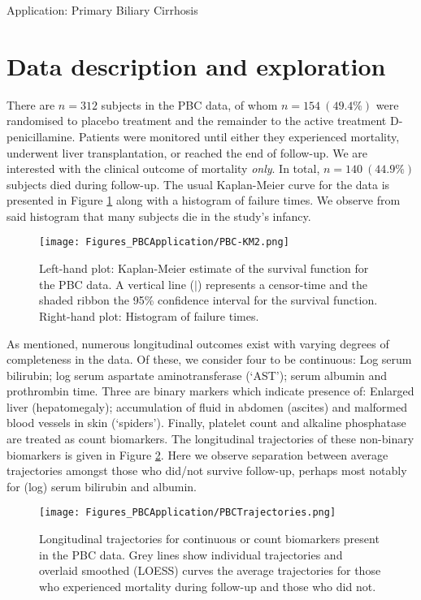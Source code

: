 \begin{chapter}{\label{cha:app-PBC}Application: Primary Biliary Cirrhosis}
  \section{Data description and exploration}\label{sec:pbc-eda}
  There are $n=312$ subjects in the PBC data, of whom $n=154\ (49.4\%)$ were randomised to placebo treatment and the remainder to the active treatment D-penicillamine. Patients were monitored until either they experienced mortality, underwent liver transplantation, or reached the end of follow-up. We are interested with the clinical outcome of mortality \textit{only}. In total, $n=140\ (44.9\%)$ subjects died during follow-up. The usual Kaplan-Meier curve for the data is presented in Figure \ref{fig:pbc-survival-KM} along with a histogram of failure times. We observe from said histogram that many subjects die in the study's infancy.

  \begin{figure}[ht]
      \centering
      \texttt{[image: Figures\_PBCApplication/PBC-KM2.png]}
      \caption{Left-hand plot: Kaplan-Meier estimate of the survival function for the PBC data. A vertical line ($|$) represents a censor-time and the shaded ribbon the 95\% confidence interval for the survival function. Right-hand plot: Histogram of failure times.}
      \label{fig:pbc-survival-KM}
  \end{figure}

  As mentioned, numerous longitudinal outcomes exist with varying degrees of completeness in the data. Of these, we consider four to be continuous: Log serum bilirubin; log serum aspartate aminotransferase (`AST'); serum albumin and prothrombin time. Three are binary markers which indicate presence of: Enlarged liver (hepatomegaly); accumulation of fluid in abdomen (ascites) and malformed blood vessels in skin (`spiders'). Finally, platelet count and alkaline phosphatase are treated as count biomarkers. The longitudinal trajectories of these non-binary biomarkers is given in Figure \ref{fig:pbc-longitudinal-nonbin}. Here we observe separation between average trajectories amongst those who did/not survive follow-up, perhaps most notably for (log) serum bilirubin and albumin.

  \begin{figure}[ht]
      \centering
      \texttt{[image: Figures\_PBCApplication/PBCTrajectories.png]}
      \caption{Longitudinal trajectories for continuous or count biomarkers present in the PBC data. Grey lines show individual trajectories and overlaid smoothed (LOESS) curves the average trajectories for those who experienced mortality during follow-up and those who did not.}
      \label{fig:pbc-longitudinal-nonbin}
  \end{figure}


\end{chapter}
